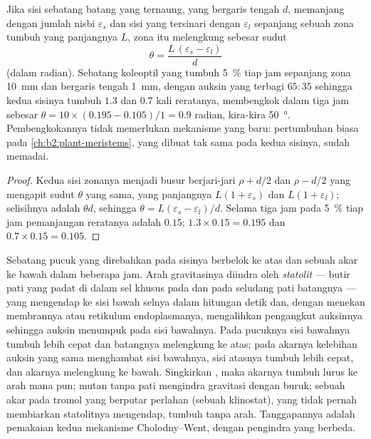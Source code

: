 \begin{theorem}\label{thm:b2:plant-plasticity:bend}
Jika sisi sebatang batang yang ternaung, yang bergaris tengah $d$,
memanjang dengan jumlah nisbi $\varepsilon_s$ dan sisi yang tersinari
dengan $\varepsilon_l$ sepanjang sebuah zona tumbuh yang panjangnya
$L$, zona itu melengkung sebesar sudut
\[
\theta = \frac{L\,(\varepsilon_s - \varepsilon_l)}{d}
\]
(dalam radian). Sebatang koleoptil yang tumbuh \qty{5}{\%} tiap jam
sepanjang zona \qty{10}{mm} dan bergaris tengah \qty{1}{mm}, dengan
auksin yang terbagi $65 : 35$ sehingga kedua sisinya tumbuh $1.3$ dan
$0.7$ kali reratanya, membengkok dalam tiga jam sebesar $\theta = 10\times(0.195 - 0.105)/1 =
0.9$ radian, kira-kira \qty{50}{\degree}. Pembengkokannya tidak
memerlukan mekanisme yang baru: pertumbuhan biasa pada
\cref{ch:b2:plant-meristems}, yang dibuat tak sama pada kedua sisinya,
sudah memadai.
\end{theorem}
\begin{proof}
Kedua sisi zonanya menjadi busur berjari-jari $\rho + d/2$ dan
$\rho - d/2$ yang mengapit sudut $\theta$ yang sama, yang panjangnya $L(1 +
\varepsilon_s)$ dan $L(1 + \varepsilon_l)$; selisihnya adalah
$\theta d$, sehingga $\theta = L(\varepsilon_s - \varepsilon_l)/d$.
Selama tiga jam pada \qty{5}{\%} tiap jam pemanjangan reratanya adalah
$0.15$; $1.3\times 0.15 = 0.195$ dan $0.7\times 0.15 = 0.105$.
\end{proof}

\begin{proposition}[Gravitropisme]\label{prop:b2:plant-plasticity:gravitropism}
Sebatang pucuk yang direbahkan pada sisinya berbelok ke atas dan sebuah
akar ke bawah dalam beberapa jam. Arah gravitasinya diindra oleh
\emph{statolit} --- butir pati yang padat di dalam sel khusus pada
 dan pada seludang pati batangnya --- yang mengendap ke sisi
bawah selnya dalam hitungan detik dan, dengan menekan membrannya atau
retikulum endoplasmanya, mengalihkan pengangkut auksinnya sehingga
auksin menumpuk pada sisi bawahnya. Pada pucuknya sisi bawahnya tumbuh
lebih cepat dan batangnya melengkung ke atas; pada akarnya kelebihan
auksin yang sama menghambat sisi bawahnya, sisi atasnya tumbuh lebih
cepat, dan akarnya melengkung ke bawah. Singkirkan , maka
akarnya tumbuh lurus ke arah mana pun; mutan tanpa pati mengindra
gravitasi dengan buruk; sebuah akar pada tromol yang berputar perlahan
(sebuah klinostat), yang tidak pernah membiarkan statolitnya mengendap,
tumbuh tanpa arah. Tanggapannya adalah pemakaian kedua mekanisme
Cholodny--Went, dengan pengindra yang berbeda.
\end{proposition}

